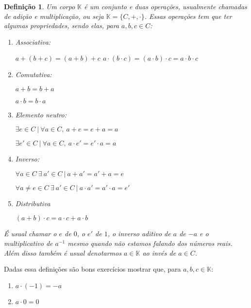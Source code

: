 \documentclass{article}
\newtheorem{definition}{Definição}[section]
\newcommand{\KK}{\mathbb{K} }
\begin{document}
\begin{definition}

Um corpo $\KK$ é um conjunto e duas operações, usualmente chamadas de adição e multiplicação, ou seja $\KK = \{C, +, \cdot\}$. Essas operações tem que ter algumas propriedades, sendo elas, para $a,b,c \in C$:

\begin{enumerate}
    \item Associativa:
    
        $a + (b + c) = (a + b) + c$
        $a \cdot (b \cdot c) = (a \cdot b) \cdot c = a \cdot b \cdot c$
        
    \item Comutativa:
    
    $a + b = b + a$
    
    $a \cdot b = b \cdot a$
    
    \item Elemento neutro:
    
    $\exists  e \in C \ | \ \forall a \in C, \ a + e = e + a = a$
    
    $\exists  e' \in C \ | \ \forall a \in C, \ a \cdot e' = e' \cdot a = a$
 
    \item Inverso:
    
   $\forall a \in C \ \exists \ a' \in C \ | \ a + a' = a' + a = e$
 
    $\forall a \ne e \in C \ \exists \ a' \in C \ | \ a \cdot a' = a' \cdot a= e'$
 
    \item Distributiva 
    
    $(a + b) \cdot c = a \cdot c + a \cdot b$
\end{enumerate}

É usual chamar o $e$ de $0$, o \textbf{$e'$} de $1$, o inverso aditivo de $a$ de $-a$ e o multiplicativo de $a^{-1}$ mesmo quando não estamos falando dos números reais. Além disso também é usual denotarmos $ a \in \KK $ ao invés de  $a \in C$.

\end{definition}

Dadas essa definições são bons exercícios mostrar que, para $a,b,c \in \KK $:
\begin{enumerate}
    \item $a \cdot (-1) = -a$
    \item $a \cdot 0 = 0$
\end{enumerate}
\end{document}
